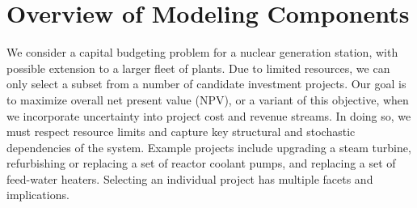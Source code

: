 \section{Overview of Modeling Components}
\label{sec:ModelingComponents}

We consider a capital budgeting problem for a nuclear generation station, with possible
extension to a larger fleet of plants. Due to limited resources, we can only select a
subset from a number of candidate investment projects. Our goal is to maximize overall net
present value (NPV), or a variant of this objective, when we incorporate uncertainty into
project cost and revenue streams. In doing so, we must respect resource limits
and capture key structural and stochastic dependencies of the system. Example projects
include upgrading a steam turbine, refurbishing or replacing a set of reactor coolant pumps,
and replacing a set of feed-water heaters. Selecting an individual project has multiple
facets and implications.


